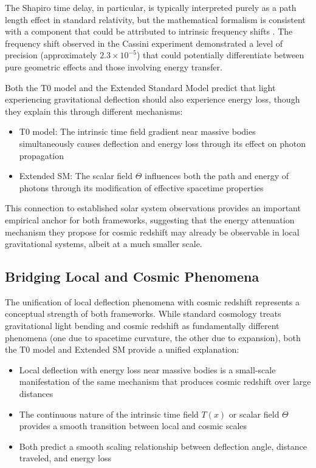 \documentclass[12pt,a4paper]{article}
\newcommand{\Tfield}{T(x)}
\begin{document}
	The Shapiro time delay, in particular, is typically interpreted purely as a path length effect in standard relativity, but the mathematical formalism is consistent with a component that could be attributed to intrinsic frequency shifts \cite{Moyer2000, Will2014}. The frequency shift observed in the Cassini experiment \cite{Bertotti2003} demonstrated a level of precision (approximately \(2.3 \times 10^{-5}\)) that could potentially differentiate between pure geometric effects and those involving energy transfer.
	
	Both the T0 model and the Extended Standard Model predict that light experiencing gravitational deflection should also experience energy loss, though they explain this through different mechanisms:
	
	\begin{itemize}
		\item T0 model: The intrinsic time field gradient near massive bodies simultaneously causes deflection and energy loss through its effect on photon propagation
		\item Extended SM: The scalar field \(\Theta\) influences both the path and energy of photons through its modification of effective spacetime properties
	\end{itemize}
	
	This connection to established solar system observations provides an important empirical anchor for both frameworks, suggesting that the energy attenuation mechanism they propose for cosmic redshift may already be observable in local gravitational systems, albeit at a much smaller scale.
	
	\subsection{Bridging Local and Cosmic Phenomena}
	\label{subsec:bridging_phenomena}
	
	The unification of local deflection phenomena with cosmic redshift represents a conceptual strength of both frameworks. While standard cosmology treats gravitational light bending and cosmic redshift as fundamentally different phenomena (one due to spacetime curvature, the other due to expansion), both the T0 model and Extended SM provide a unified explanation:
	
	\begin{itemize}
		\item Local deflection with energy loss near massive bodies is a small-scale manifestation of the same mechanism that produces cosmic redshift over large distances
		\item The continuous nature of the intrinsic time field \(\Tfield\) or scalar field \(\Theta\) provides a smooth transition between local and cosmic scales
		\item Both predict a smooth scaling relationship between deflection angle, distance traveled, and energy loss
	\end{itemize}
	
\end{document}
